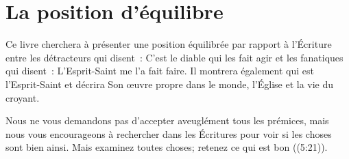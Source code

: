 \section*{La position d'équilibre}

Ce livre cherchera à présenter une position équilibrée par rapport à l'Écriture
 entre les détracteurs qui disent~: \og C'est le diable qui les fait agir \fg{}
 et les fanatiques qui disent~: \og L'Esprit-Saint me l'a fait faire. \fg{}
 Il montrera également qui est l'Esprit-Saint et décrira Son œuvre propre dans
 le monde, l'Église et la vie du croyant.

Nous ne vous demandons pas d'accepter aveuglément tous les prémices, mais nous
 vous encourageons à rechercher dans les Écritures pour voir si les choses sont
 bien ainsi. \og Mais examinez toutes choses; retenez ce qui est bon \fg{}
 ((5:21)).

\closechapter


